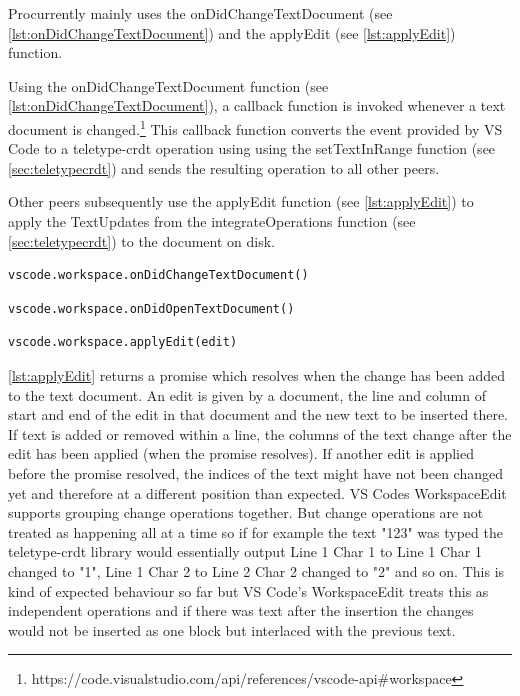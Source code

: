 Procurrently mainly uses the onDidChangeTextDocument (see \autoref{lst:onDidChangeTextDocument}) and the applyEdit (see \autoref{lst:applyEdit}) function. 

Using the onDidChangeTextDocument function (see \autoref{lst:onDidChangeTextDocument}), a callback function is invoked whenever a text document is changed.\footnote{https://code.visualstudio.com/api/references/vscode-api\#workspace} This callback function converts the event provided by VS Code to a teletype-crdt operation using using the setTextInRange function (see \autoref{sec:teletypecrdt}) and sends the resulting operation to all other peers.

Other peers subsequently use the applyEdit function (see \autoref{lst:applyEdit}) to apply the TextUpdates from the integrateOperations function (see \autoref{sec:teletypecrdt}) to the document on disk.

\begin{lstlisting}[label={lst:onDidChangeTextDocument}, caption=VS Code API onDidChangeTextDocument]
vscode.workspace.onDidChangeTextDocument()
\end{lstlisting}

\begin{lstlisting}[label={lst:onDidOpenTextDocument}, caption=VS Code API onDidOpenTextDocument]
vscode.workspace.onDidOpenTextDocument()
\end{lstlisting}

\begin{lstlisting}[label={lst:applyEdit}, caption=VS Code API applyEdit]
vscode.workspace.applyEdit(edit)
\end{lstlisting}

\autoref{lst:applyEdit} returns a promise which resolves when the change has been added to the text document.
An edit is given by a document, the line and column of start and end of the edit in that document and the new text to be inserted there.
If text is added or removed within a line, the columns of the text change after the edit has been applied (when the promise resolves). If another edit is applied before the promise resolved, the indices of the text might have not been changed yet and therefore at a different position than expected. VS Codes WorkspaceEdit supports grouping change operations together. But change operations are not treated as happening all at a time so if for example the text "123" was typed the teletype-crdt library would essentially output Line 1 Char 1 to Line 1 Char 1 changed to "1", Line 1 Char 2 to Line 2 Char 2 changed to "2" and so on. This is kind of expected behaviour so far but VS Code's WorkspaceEdit treats this as independent operations and if there was text after the insertion the changes would not be inserted as one block but interlaced with the previous text. 

